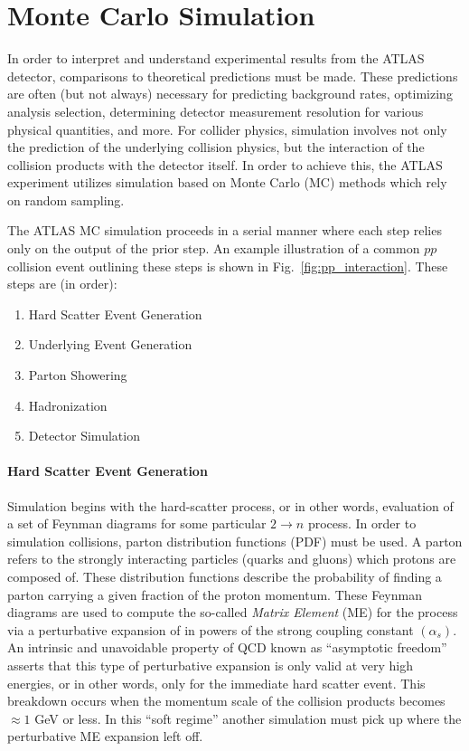 \section{Monte Carlo Simulation}
\label{sec:monte_carlo}
In order to interpret and understand experimental results from the ATLAS detector, comparisons to theoretical predictions must be made.
These predictions are often (but not always) necessary for predicting background rates, optimizing analysis selection, determining detector measurement resolution for various physical quantities, and more.
For collider physics, simulation involves not only the prediction of the underlying collision physics, but the interaction of the collision products with the detector itself.
In order to achieve this, the ATLAS experiment utilizes simulation based on Monte Carlo (MC) methods which rely on random sampling.

The ATLAS MC simulation proceeds in a serial manner where each step relies only on the output of the prior step.
An example illustration of a common $pp$ collision event outlining these steps is shown in Fig.~\ref{fig:pp_interaction}.
These steps are (in order):
\begin{enumerate}
    \itemsep0em 
    \item Hard Scatter Event Generation
    \item Underlying Event Generation
    \item Parton Showering
    \item Hadronization
    \item Detector Simulation
\end{enumerate}


\paragraph{\textbf{Hard Scatter Event Generation}}
Simulation begins with the hard-scatter process, or in other words, evaluation of a set of Feynman diagrams for some particular $2 \rightarrow n$ process.
In order to simulation collisions, parton distribution functions (PDF) must be used.
A parton refers to the strongly interacting particles (quarks and gluons) which protons are composed of.
These distribution functions describe the probability of finding a parton carrying a given fraction of the proton momentum.
These Feynman diagrams are used to compute the so-called \textit{Matrix Element} (ME) for the process via a perturbative expansion of in powers of the strong coupling constant $(\alpha_s)$.
An intrinsic and unavoidable property of QCD known as ``asymptotic freedom'' asserts that this type of perturbative expansion is only valid at very high energies, or in other words, only for the immediate hard scatter event.
This breakdown occurs when the momentum scale of the collision products becomes $\approx 1$ GeV or less.
In this ``soft regime'' another simulation must pick up where the perturbative ME expansion left off.

